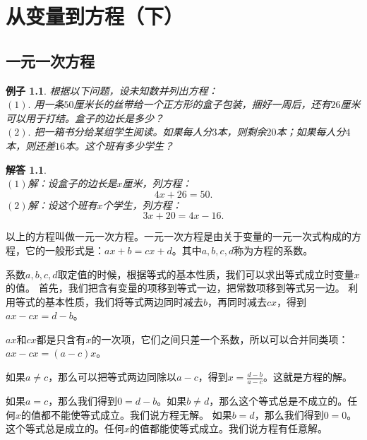 \documentclass[12pt,UTF8]{ctexbook}
\newtheorem{ex}{例子}[section]
\newtheorem*{so}{解答}
\begin{document}
\chapter{从变量到方程（下）}

\section{一元一次方程}

\begin{ex}\label{ex:4-0-0}
    根据以下问题，设未知数并列出方程：\\
    $(1).$ 用一条$50$厘米长的丝带给一个正方形的盒子包装，捆好一周后，还有$26$厘米可以用于打结。盒子的边长是多少？\\
    $(2).$ 把一箱书分给某组学生阅读。如果每人分$3$本，则剩余$20$本；如果每人分$4$本，则还差$16$本。这个班有多少学生？
\end{ex}
\begin{so}
    \mbox{} \\
    $(1)$解：设盒子的边长是$x$厘米，列方程：
    $$ 4x + 26 = 50.$$
    $(2)$解：设这个班有$x$个学生，列方程：
    $$ 3x + 20 = 4x - 16.$$
\end{so}
以上的方程叫做一元一次方程。一元一次方程是由关于变量的一元一次式构成的方程，它的一般形式是：$ax+b=cx+d$。其中$a,b,c,d$称为方程的系数。

系数$a,b,c,d$取定值的时候，根据等式的基本性质，我们可以求出等式成立时变量$x$的值。
首先，我们把含有变量的项移到等式一边，把常数项移到等式另一边。
利用等式的基本性质，我们将等式两边同时减去$b$，再同时减去$cx$，得到$ax-cx=d-b$。

$ax$和$cx$都是只含有$x$的一次项，它们之间只差一个系数，所以可以合并同类项：$ax - cx = (a - c)x$。

如果$a\neq c$，那么可以把等式两边同除以$a-c$，得到$x = \frac{d-b}{a-c}$。这就是方程的解。

如果$a = c$，那么我们得到$0 = d-b$。如果$b\neq d$，那么这个等式总是不成立的。任何$x$的值都不能使等式成立。我们说方程无解。
如果$b = d$，那么我们得到$0 = 0$。这个等式总是成立的。任何$x$的值都能使等式成立。我们说方程有任意解。
\end{document}
